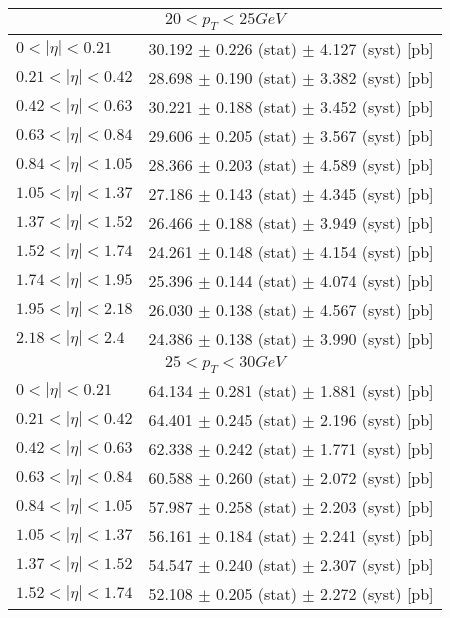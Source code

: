 \begin{tabular}{lc}
\hline
\multicolumn{2}{c}{$20 < p_{T} < 25 GeV$} \\
\hline
$0 < |\eta| <0.21$             & 30.192 $\pm$ 0.226 (stat) $\pm$ 4.127 (syst) [pb]  \\
$0.21 < |\eta| <0.42$          & 28.698 $\pm$ 0.190 (stat) $\pm$ 3.382 (syst) [pb]  \\
$0.42 < |\eta| <0.63$          & 30.221 $\pm$ 0.188 (stat) $\pm$ 3.452 (syst) [pb]  \\
$0.63 < |\eta| <0.84$          & 29.606 $\pm$ 0.205 (stat) $\pm$ 3.567 (syst) [pb]  \\
$0.84 < |\eta| <1.05$          & 28.366 $\pm$ 0.203 (stat) $\pm$ 4.589 (syst) [pb]  \\
$1.05 < |\eta| <1.37$          & 27.186 $\pm$ 0.143 (stat) $\pm$ 4.345 (syst) [pb]  \\
$1.37 < |\eta| <1.52$          & 26.466 $\pm$ 0.188 (stat) $\pm$ 3.949 (syst) [pb]  \\
$1.52 < |\eta| <1.74$          & 24.261 $\pm$ 0.148 (stat) $\pm$ 4.154 (syst) [pb]  \\
$1.74 < |\eta| <1.95$          & 25.396 $\pm$ 0.144 (stat) $\pm$ 4.074 (syst) [pb]  \\
$1.95 < |\eta| <2.18$          & 26.030 $\pm$ 0.138 (stat) $\pm$ 4.567 (syst) [pb]  \\
$2.18 < |\eta| <2.4$           & 24.386 $\pm$ 0.138 (stat) $\pm$ 3.990 (syst) [pb]  \\
\hline
\multicolumn{2}{c}{$25 < p_{T} < 30 GeV$} \\
\hline
$0 < |\eta| <0.21$             & 64.134 $\pm$ 0.281 (stat) $\pm$ 1.881 (syst) [pb]  \\
$0.21 < |\eta| <0.42$          & 64.401 $\pm$ 0.245 (stat) $\pm$ 2.196 (syst) [pb]  \\
$0.42 < |\eta| <0.63$          & 62.338 $\pm$ 0.242 (stat) $\pm$ 1.771 (syst) [pb]  \\
$0.63 < |\eta| <0.84$          & 60.588 $\pm$ 0.260 (stat) $\pm$ 2.072 (syst) [pb]  \\
$0.84 < |\eta| <1.05$          & 57.987 $\pm$ 0.258 (stat) $\pm$ 2.203 (syst) [pb]  \\
$1.05 < |\eta| <1.37$          & 56.161 $\pm$ 0.184 (stat) $\pm$ 2.241 (syst) [pb]  \\
$1.37 < |\eta| <1.52$          & 54.547 $\pm$ 0.240 (stat) $\pm$ 2.307 (syst) [pb]  \\
$1.52 < |\eta| <1.74$          & 52.108 $\pm$ 0.205 (stat) $\pm$ 2.272 (syst) [pb]  \\

\end{tabular}
